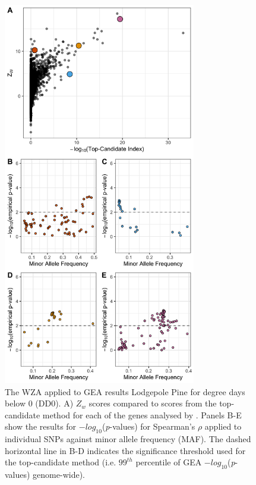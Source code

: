 \documentclass[10pt,twoside,lineno]{GSA_format}
\begin{document}
\begin{figure}[H]
  \includegraphics[width=0.75\textwidth,height=0.75\textheight,keepaspectratio]{../dataAnalsis/Z_v_MAF_DD0.png}
  \caption{The WZA applied to GEA results Lodgepole Pine for degree days below 0 (DD0). A) $Z_w$ scores compared to scores from the top-candidate method for each of the genes analysed by \cite{Yeaman2016}. Panels B-E show the results for $-log_{10}$(\textit{p}-values) for Spearman's $\rho$ applied to individual SNPs against minor allele frequency (MAF). The dashed horizontal line in B-D indicates the significance threshold used for the top-candidate method (i.e. $99^{th}$ percentile of GEA $-log_{10}$(\textit{p}-values) genome-wide).}

  \label{fig:lodgepole}
\end{figure}
\end{document}
